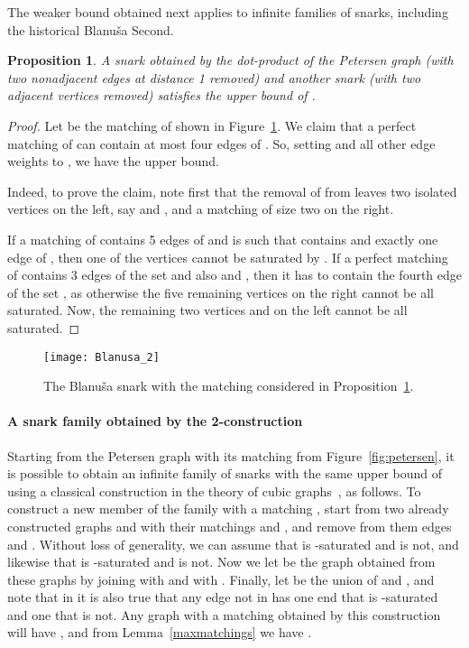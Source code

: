 \documentclass{article}
\newtheorem{proposition}[thm]{Proposition}
\begin{document}
The weaker bound obtained next applies to infinite families of snarks, including the historical Blanu\v{s}a Second.

\begin{proposition}\label{B2geral}
A snark obtained by the dot-product of the Petersen graph (with two nonadjacent edges at distance 1 removed) and another snark (with two adjacent vertices removed) satisfies the upper bound of .
\end{proposition}
\begin{proof}
Let  be the matching of  shown in Figure~\ref{fig:B2}. We claim that a perfect matching of  can contain at most four edges of . So, setting  and all other edge weights to , we have the upper bound.

Indeed, to prove the claim, note first that the removal of  from 
leaves two isolated vertices on the left, say  and ,
and a matching of size two on the right.

If a matching  of  contains 5 edges of  and is such that  contains  and exactly one edge of , 
then one of the vertices  cannot be saturated by .
If a perfect matching of  contains 3 edges of the set  and also  and , then it has to contain the fourth edge of the set ,
as otherwise the five remaining vertices on the right cannot be all
saturated. Now, the remaining two vertices  and  on the left cannot be all
saturated.
\end{proof}

\begin{figure}[ht]
\centering
\texttt{[image: Blanusa\_2]}
\caption{The Blanu\v{s}a snark  with the matching considered in Proposition~\ref{B2geral}.}
\label{fig:B2}
\end{figure}

\paragraph{A snark family obtained by the 2-construction}
Starting from the Petersen graph  with its matching  from Figure~\ref{fig:petersen}, it is possible to obtain an infinite family of snarks with the same upper bound of  using a classical construction in the theory of cubic graphs~\cite{isaacs75,Sasaki}, as follows. To construct a new member  of the family with a matching , start from two already constructed graphs  and  with their matchings  and , and remove from them edges  and . Without loss of generality, we can assume that  is -saturated and  is not, and likewise that  is -saturated and  is not. Now we let  be the graph obtained from these graphs by joining  with  and  with . Finally, let  be the union of  and , and note that in  it is also true that any edge not in  has one end that is -saturated and one that is not. Any graph  with a matching  obtained by this construction will have , and from Lemma~\ref{maxmatchings} we have .
\end{document}
